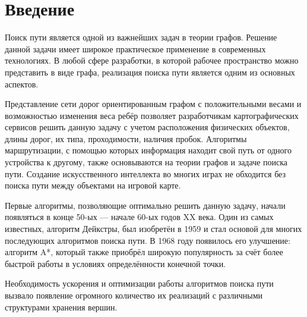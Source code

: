 \section{Введение}
Поиск пути является одной из важнейших задач в теории графов. Решение данной задачи имеет широкое практическое применение в современных технологиях. В любой сфере разработки, в которой рабочее пространство можно представить в виде графа, реализация поиска пути является одним из основных аспектов.

Представление сети дорог ориентированным графом с положительными весами и возможностью изменения веса ребёр позволяет разработчикам картографических сервисов решить данную задачу с учетом расположения физических объектов, длины дорог, их типа, проходимости, наличия пробок. Алгоритмы маршрутизации, с помощью которых информация находит свой путь от одного устройства к другому, также основываются на теории графов и задаче поиска пути. Создание искусственного интеллекта во многих играх не обходится без поиска пути между объектами на игровой карте.

Первые алгоритмы, позволяющие оптимально решить данную задачу, начали появляться в конце 50-ых — начале 60-ых годов XX века. Один из самых известных, алгоритм Дейкстры, был изобретён в 1959 и стал основой для многих последующих алгоритмов поиска пути. В 1968 году появилось его улучшение: алгоритм A*, который также приобрёл широкую популярность за счёт более быстрой работы в условиях определённости конечной точки.

Необходимость ускорения и оптимизации работы алгоритмов поиска пути вызвало появление огромного количество их реализаций с различными структурами хранения вершин.
